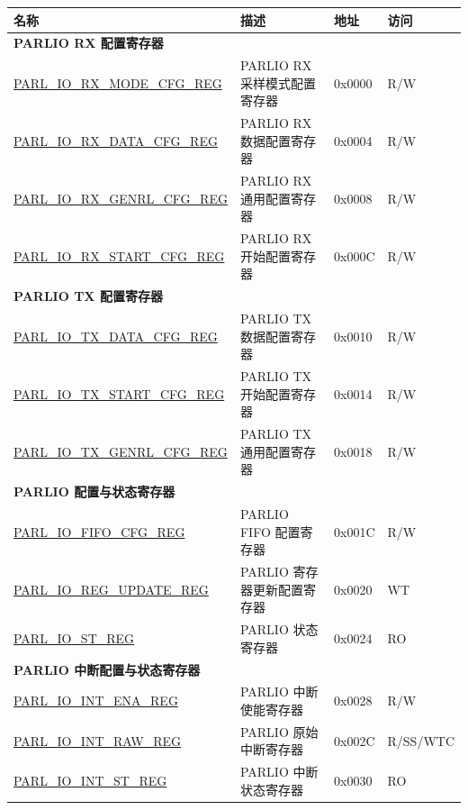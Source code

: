 \begin{longtable}{ | p{6cm} | p{6cm} | p{1.3cm} | p{1.8cm} | }
\hline\rowcolor{lightgray}
\textbf{名称} & \textbf{描述} &  \textbf{地址} & \textbf{访问} \\ \hline
\endhead
\multicolumn{4}{|l|}{\textbf{PARLIO RX 配置寄存器}} \\ \hline
\hyperref[regdesc:PARLIORXMODECFGREG]{PARL\_IO\_RX\_MODE\_CFG\_REG} & PARLIO RX 采样模式配置寄存器 & 0x0000 & R/W \\ \hline
\hyperref[regdesc:PARLIORXDATACFGREG]{PARL\_IO\_RX\_DATA\_CFG\_REG} & PARLIO RX 数据配置寄存器 & 0x0004 & R/W \\ \hline
\hyperref[regdesc:PARLIORXGENRLCFGREG]{PARL\_IO\_RX\_GENRL\_CFG\_REG} & PARLIO RX 通用配置寄存器 & 0x0008 & R/W \\ \hline
\hyperref[regdesc:PARLIORXSTARTCFGREG]{PARL\_IO\_RX\_START\_CFG\_REG} & PARLIO RX 开始配置寄存器 & 0x000C & R/W \\ \hline
\multicolumn{4}{|l|}{\textbf{PARLIO TX 配置寄存器}} \\ \hline
\hyperref[regdesc:PARLIOTXDATACFGREG]{PARL\_IO\_TX\_DATA\_CFG\_REG} & PARLIO TX 数据配置寄存器 & 0x0010 & R/W \\ \hline
\hyperref[regdesc:PARLIOTXSTARTCFGREG]{PARL\_IO\_TX\_START\_CFG\_REG} & PARLIO TX 开始配置寄存器 & 0x0014 & R/W \\ \hline
\hyperref[regdesc:PARLIOTXGENRLCFGREG]{PARL\_IO\_TX\_GENRL\_CFG\_REG} & PARLIO TX 通用配置寄存器 & 0x0018 & R/W \\ \hline
\multicolumn{4}{|l|}{\textbf{PARLIO 配置与状态寄存器}} \\ \hline
\hyperref[regdesc:PARLIOFIFOCFGREG]{PARL\_IO\_FIFO\_CFG\_REG} & PARLIO FIFO 配置寄存器 & 0x001C & R/W \\ \hline
\hyperref[regdesc:PARLIOREGUPDATEREG]{PARL\_IO\_REG\_UPDATE\_REG} & PARLIO 寄存器更新配置寄存器 & 0x0020 & WT \\ \hline
\hyperref[regdesc:PARLIOSTREG]{PARL\_IO\_ST\_REG} & PARLIO 状态寄存器  & 0x0024 & RO \\ \hline
\multicolumn{4}{|l|}{\textbf{PARLIO 中断配置与状态寄存器}} \\ \hline
\hyperref[regdesc:PARLIOINTENAREG]{PARL\_IO\_INT\_ENA\_REG} & PARLIO 中断使能寄存器 & 0x0028 & R/W \\ \hline
\hyperref[regdesc:PARLIOINTRAWREG]{PARL\_IO\_INT\_RAW\_REG} & PARLIO 原始中断寄存器 & 0x002C & R/SS/WTC \\ \hline
\hyperref[regdesc:PARLIOINTSTREG]{PARL\_IO\_INT\_ST\_REG} & PARLIO 中断状态寄存器 & 0x0030 & RO \\ \hline

\end{longtable}
